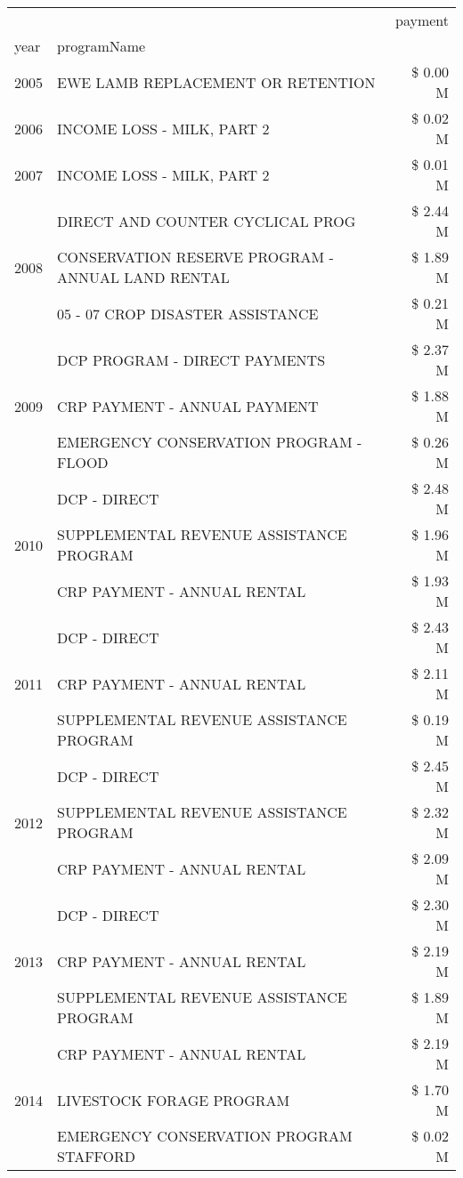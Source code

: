 \begin{tabular}{llr}
\toprule
 &  & payment \\
year & programName &  \\
\midrule
2005 & EWE LAMB REPLACEMENT OR RETENTION & \$ 0.00 M \\
\cline{1-3}
2006 & INCOME LOSS - MILK, PART 2 & \$ 0.02 M \\
\cline{1-3}
2007 & INCOME LOSS - MILK, PART 2 & \$ 0.01 M \\
\cline{1-3}
\multirow[t]{3}{*}{2008} & DIRECT AND COUNTER CYCLICAL PROG & \$ 2.44 M \\
 & CONSERVATION RESERVE PROGRAM - ANNUAL LAND RENTAL & \$ 1.89 M \\
 & 05 - 07 CROP DISASTER ASSISTANCE & \$ 0.21 M \\
\cline{1-3}
\multirow[t]{3}{*}{2009} & DCP PROGRAM - DIRECT PAYMENTS & \$ 2.37 M \\
 & CRP PAYMENT - ANNUAL PAYMENT & \$ 1.88 M \\
 & EMERGENCY CONSERVATION PROGRAM - FLOOD & \$ 0.26 M \\
\cline{1-3}
\multirow[t]{3}{*}{2010} & DCP - DIRECT & \$ 2.48 M \\
 & SUPPLEMENTAL REVENUE ASSISTANCE PROGRAM & \$ 1.96 M \\
 & CRP PAYMENT - ANNUAL RENTAL & \$ 1.93 M \\
\cline{1-3}
\multirow[t]{3}{*}{2011} & DCP - DIRECT & \$ 2.43 M \\
 & CRP PAYMENT - ANNUAL RENTAL & \$ 2.11 M \\
 & SUPPLEMENTAL REVENUE ASSISTANCE PROGRAM & \$ 0.19 M \\
\cline{1-3}
\multirow[t]{3}{*}{2012} & DCP - DIRECT & \$ 2.45 M \\
 & SUPPLEMENTAL REVENUE ASSISTANCE PROGRAM & \$ 2.32 M \\
 & CRP PAYMENT - ANNUAL RENTAL & \$ 2.09 M \\
\cline{1-3}
\multirow[t]{3}{*}{2013} & DCP - DIRECT & \$ 2.30 M \\
 & CRP PAYMENT - ANNUAL RENTAL & \$ 2.19 M \\
 & SUPPLEMENTAL REVENUE ASSISTANCE PROGRAM & \$ 1.89 M \\
\cline{1-3}
\multirow[t]{3}{*}{2014} & CRP PAYMENT - ANNUAL RENTAL & \$ 2.19 M \\
 & LIVESTOCK FORAGE PROGRAM & \$ 1.70 M \\
 & EMERGENCY CONSERVATION PROGRAM STAFFORD & \$ 0.02 M \\

\end{tabular}
